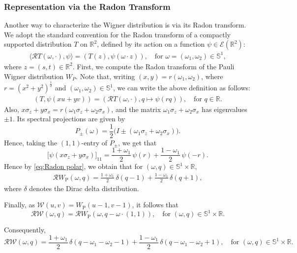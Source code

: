 \documentclass[11pt,reqno]{amsart}
\theoremstyle{plain}
\theoremstyle{definition}
\numberwithin{equation}{section}
\newcommand{\R}{\mathbb{R}}
\newcommand{\bea} {\begin{eqnarray}}
\newcommand{\eea} {\end{eqnarray}}
\begin{document}
\subsubsection{Representation via the Radon Transform}
Another way to characterize the Wigner distribution is via its Radon transform. We adopt the standard convention for the Radon transform of a compactly supported distribution $T$ on $\mathbb{R}^2$, defined by its action on a function $\psi\in\mathcal E(\R^2)$:
\bea\label{eq:radon defn}
\langle \mathcal R T(\omega,\cdot),\psi\rangle
=
( T(z),\psi(\omega\cdot z) ),
\quad
\text{for }\omega=(\omega_1,\omega_2)\in \mathbb S^1,
\eea
where $z=(s,t)\in\R^2$.
First, we compute the Radon transform of the Pauli Wigner distribution $W_P$.
Note that, writing $(x,y)=r(\omega_1,\omega_2)$, where $r=(x^2+y^2)^{\frac{1}{2}}$ and $(\omega_1,\omega_2)\in\mathbb S^1$, we can write the above definition as follows:
\bea\label{eq:Radon polar}
( T , \psi(xu+yv) )
=
( \mathcal R T(\omega,\cdot), q\mapsto \psi(r q) ),\quad \text{for } q\in \R.
\eea
Also, $x\sigma_z+y\sigma_x=r(\omega_1\sigma_z+\omega_2\sigma_x)$, and the matrix $\omega_1\sigma_z+\omega_2\sigma_x$ has eigenvalues $\pm1$. Its spectral projections are given by
$$
P_\pm(\omega)=\frac12\bigl(I\pm(\omega_1\sigma_z+\omega_2\sigma_x)\bigr).
$$
Hence, taking the $(1,1)$-entry of $P_\pm$, we get that
\[
\bigl[\psi(x\sigma_z+y\sigma_x)\bigr]_{11}
=
\frac{1+\omega_1}{2}\,\psi(r)
+
\frac{1-\omega_1}{2}\,\psi(-r).
\]
Hence by \eqref{eq:Radon polar}, we obtain that for $(\omega,q)\in\mathbb S^{1}\times \R$,
\bea\label{eq:Radon pauli}
\mathcal RW_{\mathrm P}(\omega,q)
=
\frac{1+\omega_1}{2}\,\delta(q-1)
+
\frac{1-\omega_1}{2}\,\delta(q+1),
\eea
where $\delta$ denotes the Dirac delta distribution. 

Finally, as $\mathcal W(u,v)=W_{\mathrm P}(u-1,v-1)$, it follows that 
\[
\mathcal R \mathcal{W}(\omega,q)=\mathcal RW_{\mathrm P}(\omega,q-\omega\cdot (1,1)),\quad \text{for }(\omega,q)\in\mathbb S^{1}\times \R.
\]

Consequently,
$$
\mathcal R \mathcal{W}(\omega,q)
=
\frac{1+\omega_1}{2}\,\delta(q-\omega_1-\omega_2-1)
+
\frac{1-\omega_1}{2}\,\delta(q-\omega_1-\omega_2+1), \quad \text{for }(\omega,q)\in\mathbb S^{1}\times \R.
$$

\vspace{2mm}
\end{document}
